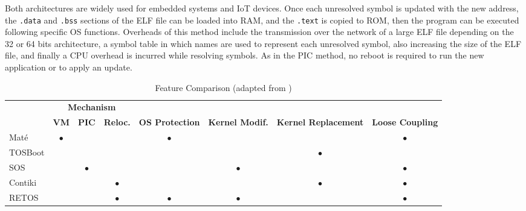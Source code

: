 \begin{itemize}
	Both architectures are widely used for embedded systems and IoT devices.
	Once each unresolved symbol is updated with the new address, the \texttt{.data} and \texttt{.bss} sections of the ELF file can be loaded into RAM, and the \texttt{.text} is copied to ROM, then the program can be executed following specific OS functions.
	Overheads of this method include the transmission over the network of a large ELF file depending on the 32 or 64 bits architecture, a symbol table in which names are used to represent each unresolved symbol, also increasing the size of the ELF file, and finally a CPU overhead is incurred while resolving symbols.
	As in the PIC method, no reboot is required to run the new application or to apply an update.
\end{itemize}

\begin{table}[htb]
	\scriptsize
	\centering
	\caption{Feature Comparison (adapted from  \cite{oliver2014reprogramming})}
	\label{tab:deployMethods}
	\begin{tabular}{lccccccc}
		& \multicolumn{3}{c}{\textbf{Mechanism}}       & \multicolumn{4}{c}{}                                                                                          \\
		& \textbf{VM} & \textbf{PIC} & \textbf{Reloc.} & \textbf{OS Protection} & \textbf{Kernel Modif.} & \textbf{Kernel Replacement} & \textbf{Loose Coupling} \\ \hline
		Mat\'e \cite{levis2002mate}      & $\bullet$           &              &                 & $\bullet$                      &                              &                             & $\bullet$                      \\ \hline
		TOSBoot \cite{hui2004dynamic}    &             &              &                 &                        &                              & $\bullet$                           &                         \\ \hline
		SOS \cite{han2005dynamic}        &             & $\bullet$            &                 &                        & $\bullet$                            &                             & $\bullet$                       \\ \hline
		Contiki \cite{dunkels2004contiki}    &             &              & $\bullet$               &                        &                              & $\bullet$                           & $\bullet$                       \\ \hline
		RETOS \cite{cha2007retos}      &             &              & $\bullet$               & $\bullet$                      & $\bullet$                            &                             & $\bullet$                       \\ \hline

\end{tabular}
\end{table}
